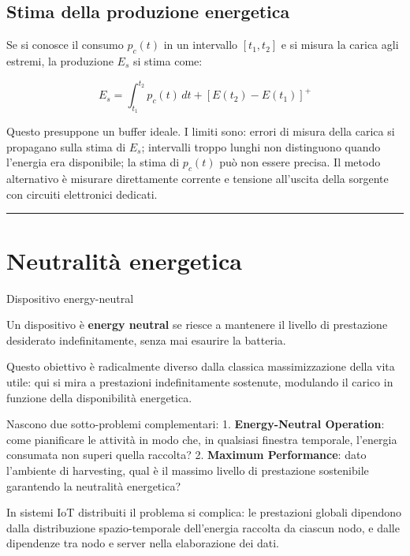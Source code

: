 \documentclass[
  italian,
  openany]{book}
\begin{document}
\subsection{Stima della produzione
energetica}\label{stima-della-produzione-energetica}

Se si conosce il consumo \(p_c(t)\) in un intervallo \([t_1, t_2]\) e si
misura la carica agli estremi, la produzione \(E_s\) si stima come:

\[E_s = \int_{t_1}^{t_2} p_c(t)\,dt + [E(t_2) - E(t_1)]^+\]

Questo presuppone un buffer ideale. I limiti sono: errori di misura
della carica si propagano sulla stima di \(E_s\); intervalli troppo
lunghi non distinguono quando l'energia era disponibile; la stima di
\(p_c(t)\) può non essere precisa. Il metodo alternativo è misurare
direttamente corrente e tensione all'uscita della sorgente con circuiti
elettronici dedicati.

\begin{center}\rule{0.5\linewidth}{0.5pt}\end{center}

\section{Neutralità energetica}\label{neutralituxe0-energetica}

\begin{calloutdefinition}{Dispositivo energy-neutral}

Un dispositivo è \textbf{energy neutral} se riesce a mantenere il
livello di prestazione desiderato indefinitamente, senza mai esaurire la
batteria.

\end{calloutdefinition}

Questo obiettivo è radicalmente diverso dalla classica massimizzazione
della vita utile: qui si mira a prestazioni indefinitamente sostenute,
modulando il carico in funzione della disponibilità energetica.

Nascono due sotto-problemi complementari: 1. \textbf{Energy-Neutral
Operation}: come pianificare le attività in modo che, in qualsiasi
finestra temporale, l'energia consumata non superi quella raccolta? 2.
\textbf{Maximum Performance}: dato l'ambiente di harvesting, qual è il
massimo livello di prestazione sostenibile garantendo la neutralità
energetica?

In sistemi IoT distribuiti il problema si complica: le prestazioni
globali dipendono dalla distribuzione spazio-temporale dell'energia
raccolta da ciascun nodo, e dalle dipendenze tra nodo e server nella
elaborazione dei dati.
\end{document}
